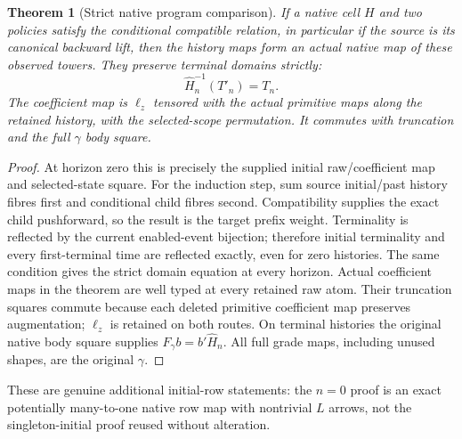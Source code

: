 \documentclass[11pt]{article}
\newtheorem{theorem}{Theorem}\newtheorem{definition}{Definition}
\begin{document}
\begin{theorem}[Strict native program comparison]
If a native cell $H$ and two policies satisfy the conditional compatible
relation, in particular if the source is its canonical backward lift,
then the history maps form an actual native map of these observed towers.
They preserve terminal domains strictly:
\[
 \widehat H_n^{-1}(T'_n)=T_n.
\]
The coefficient map is $\ell_z$ tensored with the actual primitive maps
along the retained history, with the selected-scope permutation. It commutes
with truncation and the full $\gamma$ body square.
\end{theorem}
\begin{proof}
At horizon zero this is precisely the supplied initial raw/coefficient map
and selected-state square. For the induction step, sum source initial/past
history fibres first and conditional child fibres second. Compatibility
supplies the exact child pushforward, so the result is the target prefix
weight. Terminality is reflected by the current enabled-event bijection;
therefore initial terminality and every first-terminal time are reflected
exactly, even for zero histories. The same condition gives the strict domain
equation at every horizon. Actual coefficient maps in the theorem are
well typed at every retained raw atom. Their truncation squares commute
because each deleted primitive coefficient map preserves augmentation;
$\ell_z$ is retained on both routes. On terminal histories the original
native body square supplies $F_\gamma b=b'\widehat H_n$. All full grade
maps, including unused shapes, are the original $\gamma$.
\end{proof}
These are genuine additional initial-row statements: the $n=0$ proof is an
exact potentially many-to-one native row map with nontrivial $L$ arrows,
not the singleton-initial proof reused without alteration.
\end{document}
